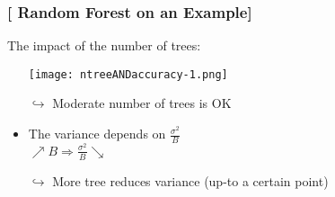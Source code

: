 \documentclass[xcolor=x11names,compress, aspectratio=169]{beamer}
\renewcommand{\(}{\begin{columns}}
\renewcommand{\)}{\end{columns}}
\newcommand{\<}[1]{\begin{column}{#1}}
\renewcommand{\>}{\end{column}}
\begin{document}





\begin{frame}
\frametitle{\textcolor{brique}{[ Random Forest on an Example]}}
The impact of the number of trees:
\pause
\begin{itemize}[<+->]
    \item[] \texttt{[image: ntreeANDaccuracy-1.png]} %
    \item[$\hookrightarrow$] Moderate number of trees is OK
    \item The variance depends on $\frac{\sigma^{2}}{B}$ \\
    $\nearrow  B \Longrightarrow \frac{\sigma^{2}}{B}  \searrow $\\
   \item[$\hookrightarrow$] More tree reduces variance (up-to a certain point)
\end{itemize}
\end{frame}
\end{document}
